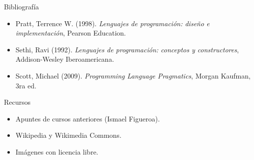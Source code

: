 \documentclass{beamer} %
\begin{document}
\begin{frame}
 \begin{block}{Bibliografía}
  \begin{itemize}
    \item Pratt, Terrence W. (1998). \textit{Lenguajes de programación: diseño e implementación}, Pearson Education.
    \item Sethi, Ravi (1992). \textit{Lenguajes de programación: conceptos y constructores}, Addison-Wesley Iberoamericana.
    \item Scott, Michael (2009). \textit{Programming Language Pragmatics}, Morgan Kaufman, 3ra ed.
  \end{itemize}
 \end{block}
 \begin{block}{Recursos}
  \begin{itemize}
    \item Apuntes de cursos anteriores (Ismael Figueroa).
    \item Wikipedia y Wikimedia Commons.
    \item Imágenes con licencia libre.
  \end{itemize}
 \end{block}
\end{frame}
\end{document}
